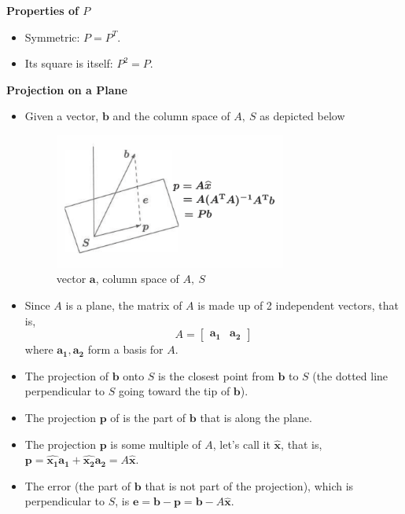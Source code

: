 \documentclass[11pt]{article}
\begin{document}
\textbf{Properties of $P$}
\begin{itemize}
    \item Symmetric: $P=P^T$.
    \item Its square is itself: $P^2=P$.
\end{itemize}

\textbf{Projection on a Plane}
\begin{itemize}
    \item Given a vector, $\boldsymbol{b}$ and the column space of $A, \ S$ as depicted below
    \begin{figure}[H] 
        \centering 
        \includegraphics[width=3in]{imgs/plane_projection.png}
        \caption{vector $\boldsymbol{a}$, column space of $A, \ S$}
    \end{figure}
    \item Since $A$ is a plane, the matrix of $A$ is made up of 2 independent vectors, that is,
    \[ A= \begin{bmatrix}
        \boldsymbol{a_1} & \boldsymbol{a_2}
    \end{bmatrix} \]
    where $\boldsymbol{a_1}, \boldsymbol{a_2}$ form a basis for $A$.
    \item The projection of $\boldsymbol{b}$ onto $S$ is the closest point from $\boldsymbol{b}
    $ to $S$ (the dotted line perpendicular to $S$ going toward the tip of $\boldsymbol{b}$).
    \item The projection $\boldsymbol{p}$ of is the part of $\boldsymbol{b}$ that is along the 
    plane.
    \item The projection $\boldsymbol{p}$ is some multiple of $A$, let's call it 
    $\boldsymbol{\hat{x}}$, that is, $\boldsymbol{p}=\boldsymbol{\boldsymbol{\hat{x_1}}}
    \boldsymbol{a_1} + \boldsymbol{\hat{x_2}}\boldsymbol{a_2} = 
    A\boldsymbol{\hat{x}}$.
    \item The error (the part of $\boldsymbol{b}$ that is not part of the projection), which is
    perpendicular to $S$, is $\boldsymbol{e} = \boldsymbol{b} - \boldsymbol{p} = 
    \boldsymbol{b} - A\boldsymbol{\hat{x}}$.

\end{itemize}
\end{document}
